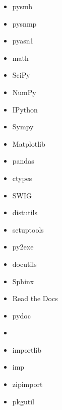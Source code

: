 \documentclass{article}
\begin{document}
\begin{enumerate}
\begin{itemize}
            \item pysmb

            \item pysnmp

            \item pyasn1

            \item math
            \item SciPy
            \item NumPy
            \item IPython
            \item Sympy
            \item Matplotlib
            \item pandas

            \item ctypes
            \item SWIG

            \item distutils
            \item setuptools
            \item py2exe

            \item docutils
            \item Sphinx
            \item Read the Docs
            \item pydoc

            \item

            \item importlib
            \item imp
            \item zipimport
            \item pkgutil


\end{itemize}
\end{enumerate}
\end{document}
